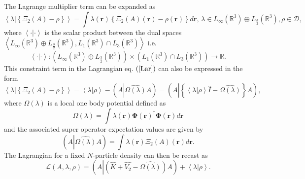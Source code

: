 \documentclass[aps,preprint]{revtex4}%
\begin{document}
The Lagrange multiplier term can be expanded as
\begin{equation}
\left\langle \left.  \lambda\right\vert \left\{  \Xi_{2}\left(  A\right)
-\rho\right\}  \right\rangle =\int\lambda\left(  \boldsymbol{r}\right)
\left\{  \Xi_{2}\left(  A\right)  \left(  \boldsymbol{r}\right)  -\rho\left(
\boldsymbol{r}\right)  \right\}  d\boldsymbol{r},\boldsymbol{\,}\lambda\in
L_{\infty}\left(  \mathbb{R}^{3}\right)  \oplus L_{\frac{3}{2}}\left(
\mathbb{R}^{3}\right)  ,\rho\in\mathcal{D},
\end{equation}
where $\left\langle \cdot|\cdot\right\rangle $ is the scalar product between
the dual spaces $\left\langle L_{\infty}\left(  \mathbb{R}^{3}\right)  \oplus
L_{\frac{3}{2}}\left(  \mathbb{R}^{3}\right)  ,L_{1}\left(  \mathbb{R}%
^{3}\right)  \cap L_{3}\left(  \mathbb{R}^{3}\right)  \right\rangle $ i.e.
\begin{equation}
\left\langle \cdot|\cdot\right\rangle :\left(  L_{\infty}\left(
\mathbb{R}^{3}\right)  \oplus L_{\frac{3}{2}}\left(  \mathbb{R}^{3}\right)
\right)  \times\left(  L_{1}\left(  \mathbb{R}^{3}\right)  \cap L_{3}\left(
\mathbb{R}^{3}\right)  \right)  \rightarrow\mathbb{R}.
\end{equation}
This constraint term in the Lagrangian eq. $\left(  \ref{Lar}\right)  $ can
also be expressed in the form
\begin{equation}
\left\langle \left.  \lambda\right\vert \left\{  \Xi_{2}\left(  A\right)
-\rho\right\}  \right\rangle =\left\langle \lambda\left\vert \rho\right.
\right\rangle -\left(  A\left\vert \widehat{\Omega\left(  \lambda\right)
}\right.  A\right)  =\left(  A\left\vert \left\{  \left\langle \lambda
\left\vert \rho\right.  \right\rangle \hat{I}-\widehat{\Omega\left(
\lambda\right)  }\right\}  \right.  A\right)  ,
\end{equation}
where $\Omega\left(  \lambda\right)  $ is a local one body potential defined
as
\begin{equation}
\Omega\left(  \lambda\right)  =\int\lambda\left(  \boldsymbol{r}\right)
\boldsymbol{\Phi}\left(  \boldsymbol{r}\right)  ^{\dagger}\boldsymbol{\Phi
}\left(  \boldsymbol{r}\right)  d\boldsymbol{r}%
\end{equation}
and the associated super operator expectation values are given by
\begin{equation}
\left(  A\left\vert \widehat{\Omega\left(  \lambda\right)  }\right.  A\right)
=\int\lambda\left(  \boldsymbol{r}\right)  \Xi_{2}\left(  A\right)  \left(
\boldsymbol{r}\right)  d\boldsymbol{r.}%
\end{equation}
The Lagrangian for a fixed $N$-particle density can then be recast as
\begin{equation}
\mathcal{L}\left(  A,\lambda,\rho\right)  =\left(  A\left\vert \left(
\widehat{K}+\widehat{V_{2}}-\widehat{\Omega\left(  \lambda\right)  }\right)
A\right.  \right)  +\left\langle \lambda\left\vert \rho\right.  \right\rangle
.
\end{equation}
\end{document}
